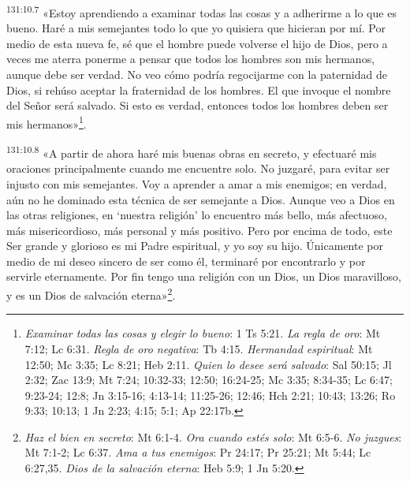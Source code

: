 \par 
\textsuperscript{131:10.7} «Estoy aprendiendo a examinar todas las cosas y a adherirme a lo que es bueno. Haré a mis semejantes todo lo que yo quisiera que hicieran por mí. Por medio de esta nueva fe, sé que el hombre puede volverse el hijo de Dios, pero a veces me aterra ponerme a pensar que todos los hombres son mis hermanos, aunque debe ser verdad. No veo cómo podría regocijarme con la paternidad de Dios, si rehúso aceptar la fraternidad de los hombres. El que invoque el nombre del Señor será salvado. Si esto es verdad, entonces todos los hombres deben ser mis hermanos»\footnote{\textit{Examinar todas las cosas y elegir lo bueno}: 1 Ts 5:21. \textit{La regla de oro}: Mt 7:12; Lc 6:31. \textit{Regla de oro negativa}: Tb 4:15. \textit{Hermandad espiritual}: Mt 12:50; Mc 3:35; Lc 8:21; Heb 2:11. \textit{Quien lo desee será salvado}: Sal 50:15; Jl 2:32; Zac 13:9; Mt 7:24; 10:32-33; 12:50; 16:24-25; Mc 3:35; 8:34-35; Lc 6:47; 9:23-24; 12:8; Jn 3:15-16; 4:13-14; 11:25-26; 12:46; Hch 2:21; 10:43; 13:26; Ro 9:33; 10:13; 1 Jn 2:23; 4:15; 5:1; Ap 22:17b.}.

\par 
\textsuperscript{131:10.8} «A partir de ahora haré mis buenas obras en secreto, y efectuaré mis oraciones principalmente cuando me encuentre solo. No juzgaré, para evitar ser injusto con mis semejantes. Voy a aprender a amar a mis enemigos; en verdad, aún no he dominado esta técnica de ser semejante a Dios. Aunque veo a Dios en las otras religiones, en `nuestra religión' lo encuentro más bello, más afectuoso, más misericordioso, más personal y más positivo. Pero por encima de todo, este Ser grande y glorioso es mi Padre espiritual, y yo soy su hijo. Únicamente por medio de mi deseo sincero de ser como él, terminaré por encontrarlo y por servirle eternamente. Por fin tengo una religión con un Dios, un Dios maravilloso, y es un Dios de salvación eterna»\footnote{\textit{Haz el bien en secreto}: Mt 6:1-4. \textit{Ora cuando estés solo}: Mt 6:5-6. \textit{No juzgues}: Mt 7:1-2; Lc 6:37. \textit{Ama a tus enemigos}: Pr 24:17; Pr 25:21; Mt 5:44; Lc 6:27,35. \textit{Dios de la salvación eterna}: Heb 5:9; 1 Jn 5:20.}.